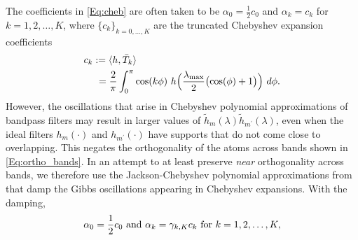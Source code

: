 \documentclass[journal, 10pt]{IEEEtran}
\begin{document}
The coefficients in \eqref{Eq:cheb} are often taken to be $\alpha_0=\frac{1}{2}c_0$ and $\alpha_k=c_k$ for $k=1,2,\ldots,K$, where  $\{c_k\}_{k=0,\ldots,K}$ are the truncated Chebyshev expansion coefficients 
\begin{align}\label{Eq:cheb_coeff}
c_{k}&:=\langle h , \bar{T}_k \rangle \nonumber \\&~= \frac{2}{\pi}\int_{0}^{\pi}\cos(k\phi)~h\Bigl(\frac{\lambda_{\max}}{2} \bigl(\cos(\phi) +1\bigr)\Bigr)~d\phi.
\end{align}
However, the oscillations that arise in Chebyshev polynomial approximations of bandpass filters may result in larger values of $\tilde{h}_m(\lambda)\tilde{h}_{m^{\prime}}(\lambda)$, even when the ideal filters $h_m(\cdot)$ and $h_{m^{\prime}}(\cdot)$ have supports that do not come close to overlapping. This negates the orthogonality of the atoms across bands shown in \eqref{Eq:ortho_bands}. In an attempt to at least preserve \emph{near} orthogonality across bands, we 
therefore use the Jackson-Chebyshev polynomial approximations from \cite{di2016efficient,puy_structured_sampling} that damp the Gibbs oscillations appearing in Chebyshev expansions. With the damping, 
\begin{align}\label{Eq:damping1}
\alpha_0=\frac{1}{2}c_0 \hbox{ and }\alpha_k=\gamma_{k,K}c_k \hbox{ for }k=1,2,\ldots,K, 
\end{align}
\end{document}
